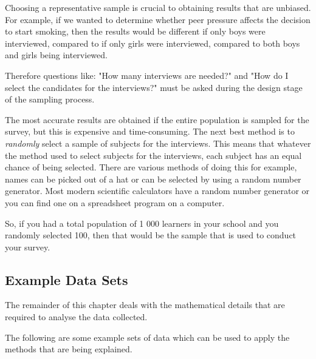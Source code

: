 \begin{description}[noitemsep]
\begin{description}[noitemsep]
\begin{figure}[H]
\begin{center}
    \end{center}
 \end{figure}       
        \par 
        \label{m39403*id200766}Choosing a representative sample is crucial to obtaining results that are unbiased. For example, if we wanted to determine whether peer pressure affects the decision to start smoking, then the results would be different if only boys were interviewed, compared to if only girls were interviewed, compared to both boys and girls being interviewed.\par 
        \label{m39403*id200773}Therefore questions like: "How many interviews are needed?" and "How do I select the candidates for the interviews?" must be asked during the design stage of the sampling process.\par 
        \label{m39403*id200777}The most accurate results are obtained if the entire population is sampled for the survey, but this is expensive and time-consuming. The next best method is to \textsl{randomly} select a sample of subjects for the interviews. This means that whatever the method used to select subjects for the interviews, each subject has an equal chance of being selected. There are various methods of doing this for example, names can be picked out of a hat or can be selected by using a random number generator. Most modern scientific calculators have a random number generator or you can find one on a spreadsheet program on a computer.\par 
        \label{m39403*id200791}So, if you had a total population of 1 000 learners in your school and you randomly selected 100, then that would be the sample that is used to conduct your survey.\par 
    \label{m39403*cid4}
            \subsection{ Example Data Sets}
            \nopagebreak
      \label{m39403*id200805}The remainder of this chapter deals with the mathematical details that are required to analyse the data collected.\par 
      \label{m39403*id200809}The following are some example sets of data which can be used to apply the methods that are being explained.\par 
      \label{m39403*uid24}

\end{description}
\end{description}
